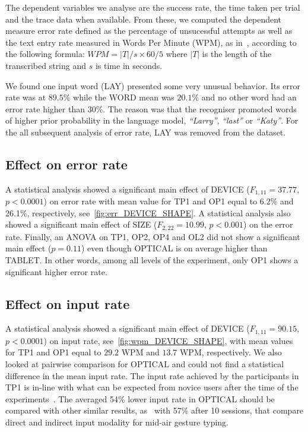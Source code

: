 \documentclass{chi-ext}
\newcommand{\cdt}[1]{{\small\uppercase{{#1}}}}
\begin{document}
The dependent variables we analyse are the success rate, the time taken per trial and the trace data when available. From these, we computed the dependent measure error rate defined as the percentage of unsucessful attempts as well as the text entry rate measured in Words Per Minute (WPM), as in~\cite{Markussen2014}, according to the following formula: $WPM = |T|/s \times 60/5$ where $|T|$ is the length of the transcribed string and $s$ is time in seconds.


We found one input word (\cdt{lay}) presented some very unusual behavior. Its error rate was at $89.5\%$ while the \cdt{WORD} mean was $20.1\%$ and no other word had an error rate higher than $30\%$. The reason was that the recogniser promoted words of higher prior probability in the language model, \textit{``Larry''}, \textit{``last''} or \textit{``Katy''}. For the all subsequent analysis of error rate, \cdt{lay} was removed from the dataset.



\subsection{Effect on error rate}
A statistical analysis showed a significant main effect of DEVICE ($F_{1,11} = 37.77$, $p < 0.0001$) on error rate with mean value for \cdt{TP1} and \cdt{OP1} equal to 6.2\% and 26.1\%, respectively, see~\autoref{fig:err_DEVICE_SHAPE}. A statistical analysis also showed a significant main effect of \cdt{SIZE} ($F_{2,22} = 10.99$, $p < 0.001$) on the error rate. Finally, an ANOVA on \cdt{TP1}, \cdt{OP2}, \cdt{OP4} and \cdt{OL2} did not show a significant main effect ($p = 0.11$) even though \cdt{OPTICAL} is on average higher than \cdt{TABLET}. In other words, among all levels of the experiment, only \cdt{OP1} shows a significant higher error rate.

\subsection{Effect on input rate}
A statistical analysis showed a significant main effect of \cdt{DEVICE} ($F_{1,11} = 90.15$, $p < 0.0001$) on input rate, see~\autoref{fig:wpm_DEVICE_SHAPE}, with mean values for \cdt{TP1} and \cdt{OP1} equal to $29.2$ WPM and $13.7$ WPM, respectively. We also looked at pairwise comparison
for \cdt{OPTICAL} and could not find a statistical difference in the mean input rate. The input rate achieved by the participants in \cdt{TP1} is in-line with what can be expected from novice users after the time of the experiments~\cite{Kristensson2004}. The averaged 54\% lower input rate in \cdt{OPTICAL} should be compared with other similar results, as~\cite{Markussen2014} with 57\% after 10 sessions, that compare direct and indirect input modality for mid-air gesture typing.
\end{document}
